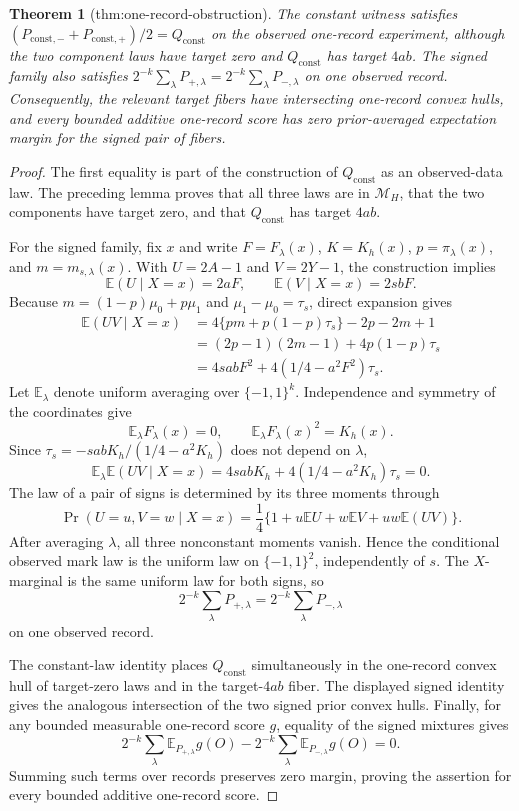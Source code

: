 \documentclass{article}
\newtheorem{theorem}{Theorem}
\begin{document}
\begin{theorem}[thm:one-record-obstruction]\label{thm:one-record-obstruction}
The constant witness satisfies \((P_{\mathrm{const},-}+P_{\mathrm{const},+})/2=Q_{\mathrm{const}}\) on the observed one-record experiment, although the two component laws have target zero and \(Q_{\mathrm{const}}\) has target \(4ab\). The signed family also satisfies \(2^{-k}\sum_\lambda P_{+,\lambda}=2^{-k}\sum_\lambda P_{-,\lambda}\) on one observed record. Consequently, the relevant target fibers have intersecting one-record convex hulls, and every bounded additive one-record score has zero prior-averaged expectation margin for the signed pair of fibers.
\end{theorem}
\begin{proof}
The first equality is part of the construction of \(Q_{\mathrm{const}}\) as an observed-data law.  The preceding lemma proves that all three laws are in \(\mathcal M_H\), that the two components have target zero, and that \(Q_{\mathrm{const}}\) has target \(4ab\).

For the signed family, fix \(x\) and write \(F=F_\lambda(x)\), \(K=K_h(x)\), \(p=\pi_\lambda(x)\), and \(m=m_{s,\lambda}(x)\).  With \(U=2A-1\) and \(V=2Y-1\), the construction implies
\[
 \mathbb E(U\mid X=x)=2aF,
 \qquad
 \mathbb E(V\mid X=x)=2sbF.
\]
Because \(m=(1-p)\mu_0+p\mu_1\) and \(\mu_1-\mu_0=\tau_s\), direct expansion gives
\[
 \begin{aligned}
 \mathbb E(UV\mid X=x)
 &=4\{pm+p(1-p)\tau_s\}-2p-2m+1\\
 &=(2p-1)(2m-1)+4p(1-p)\tau_s\\
 &=4sabF^2+4(1/4-a^2F^2)\tau_s.
 \end{aligned}
\]
Let \(\mathbb E_\lambda\) denote uniform averaging over \(\{-1,1\}^k\).  Independence and symmetry of the coordinates give
\[
 \mathbb E_\lambda F_\lambda(x)=0,
 \qquad
 \mathbb E_\lambda F_\lambda(x)^2=K_h(x).
\]
Since \(\tau_s=-sabK_h/(1/4-a^2K_h)\) does not depend on \(\lambda\),
\[
 \mathbb E_\lambda\mathbb E(UV\mid X=x)
 =4sabK_h+4(1/4-a^2K_h)\tau_s=0.
\]
The law of a pair of signs is determined by its three moments through
\[
 \Pr(U=u,V=w\mid X=x)
 =\frac14\{1+u\mathbb E U+w\mathbb E V+uw\mathbb E(UV)\}.
\]
After averaging \(\lambda\), all three nonconstant moments vanish.  Hence the conditional observed mark law is the uniform law on \(\{-1,1\}^2\), independently of \(s\).  The \(X\)-marginal is the same uniform law for both signs, so
\[
 2^{-k}\sum_\lambda P_{+,\lambda}
 =2^{-k}\sum_\lambda P_{-,\lambda}
\]
on one observed record.

The constant-law identity places \(Q_{\mathrm{const}}\) simultaneously in the one-record convex hull of target-zero laws and in the target-\(4ab\) fiber.  The displayed signed identity gives the analogous intersection of the two signed prior convex hulls.  Finally, for any bounded measurable one-record score \(g\), equality of the signed mixtures gives
\[
 2^{-k}\sum_\lambda\mathbb E_{P_{+,\lambda}}g(O)
 -2^{-k}\sum_\lambda\mathbb E_{P_{-,\lambda}}g(O)=0.
\]
Summing such terms over records preserves zero margin, proving the assertion for every bounded additive one-record score.
\end{proof}
\end{document}
